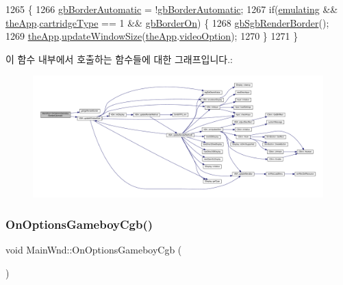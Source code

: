 \begin{DoxyCode}
1265 \{
1266   \mbox{\hyperlink{gb_globals_8cpp_aa48c27f0812b59fa3489b9f026d9533b}{gbBorderAutomatic}} = !\mbox{\hyperlink{gb_globals_8cpp_aa48c27f0812b59fa3489b9f026d9533b}{gbBorderAutomatic}};
1267   \textcolor{keywordflow}{if}(\mbox{\hyperlink{_main_wnd_options_8cpp_af9cc36078b1b311753963297ae7f2a74}{emulating}} && \mbox{\hyperlink{_v_b_a_8cpp_a8095a9d06b37a7efe3723f3218ad8fb3}{theApp}}.\mbox{\hyperlink{class_v_b_a_af300759fcbc7eeb00ce73f956fc5ddb7}{cartridgeType}} == 1 && 
      \mbox{\hyperlink{gb_globals_8cpp_a4700c36a68a6b63f7c2e91756a250cd2}{gbBorderOn}}) \{
1268     \mbox{\hyperlink{_g_b_8h_af317983dce6743159185981f1f84e782}{gbSgbRenderBorder}}();
1269     \mbox{\hyperlink{_v_b_a_8cpp_a8095a9d06b37a7efe3723f3218ad8fb3}{theApp}}.\mbox{\hyperlink{class_v_b_a_ac278ece4958310ce2ef8751afbad08f3}{updateWindowSize}}(\mbox{\hyperlink{_v_b_a_8cpp_a8095a9d06b37a7efe3723f3218ad8fb3}{theApp}}.\mbox{\hyperlink{class_v_b_a_a17dac073149c897f770c00ed7098ad32}{videoOption}});
1270   \}
1271 \}
\end{DoxyCode}
이 함수 내부에서 호출하는 함수들에 대한 그래프입니다.\+:
\nopagebreak
\begin{figure}[H]
\begin{center}
\leavevmode
\includegraphics[width=350pt]{class_main_wnd_a3a618010f19c5aa69a036380631eaea7_cgraph}
\end{center}
\end{figure}
\mbox{\label{class_main_wnd_a962d2f50647e403aff3939a87cbfbd83}} 
\subsubsection{\texorpdfstring{On\+Options\+Gameboy\+Cgb()}{OnOptionsGameboyCgb()}}
{\footnotesize\ttfamily void Main\+Wnd\+::\+On\+Options\+Gameboy\+Cgb (\begin{DoxyParamCaption}{ }\end{DoxyParamCaption})\hspace{0.3cm}{\ttfamily [protected]}}




